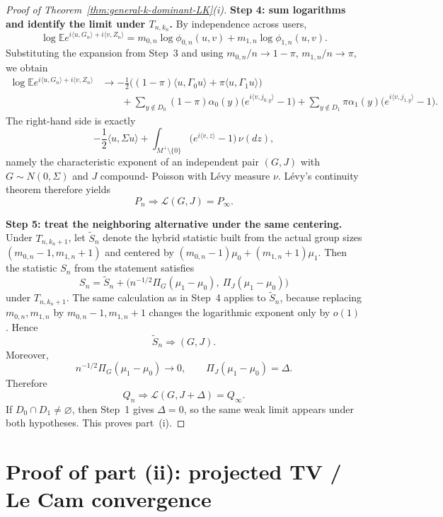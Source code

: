 \documentclass{article}
\newcommand{\E}{\mathbb E}
\newcommand{\1}{\mathbf 1}
\newcommand{\weakto}{\Longrightarrow}
\begin{document}
\begin{proof}[Proof of Theorem~\ref{thm:general-k-dominant-LK}(i)]
\medskip
\textbf{Step 4: sum logarithms and identify the limit under $T_{n,k_n}$.}
By independence across users,
\[
\log \E e^{i\langle u,G_n\rangle+i\langle v,Z_n\rangle}
=
 m_{0,n}\log\phi_{0,n}(u,v)+m_{1,n}\log\phi_{1,n}(u,v).
\]
Substituting the expansion from Step~3 and using $m_{0,n}/n\to 1-\pi$, $m_{1,n}/n\to \pi$, we obtain
\begin{align*}
\log \E e^{i\langle u,G_n\rangle+i\langle v,Z_n\rangle}
&\to
-\frac12\bigl((1-\pi)\langle u,\Gamma_0u\rangle+\pi\langle u,\Gamma_1u\rangle\bigr) \\
&\qquad +\sum_{y\notin D_0}(1-\pi)\alpha_0(y)\bigl(e^{i\langle v,j_{0,y}\rangle}-1\bigr)
+\sum_{y\notin D_1}\pi\alpha_1(y)\bigl(e^{i\langle v,j_{1,y}\rangle}-1\bigr).
\end{align*}
The right-hand side is exactly
\[
-\frac12\langle u,\Sigma u\rangle
+
\int_{M^\perp\setminus\{0\}} \bigl(e^{i\langle v,z\rangle}-1\bigr)\,\nu(dz),
\]
namely the characteristic exponent of an independent pair $(G,J)$ with $G\sim N(0,\Sigma)$ and $J$ compound-
Poisson with L\'evy measure $\nu$. L\'evy's continuity theorem therefore yields
\[
P_n\weakto \mathcal L(G,J)=P_\infty.
\]

\medskip
\textbf{Step 5: treat the neighboring alternative under the same centering.}
Under $T_{n,k_n+1}$, let $\widetilde S_n$ denote the hybrid statistic built from the actual group sizes
$(m_{0,n}-1,m_{1,n}+1)$ and centered by $(m_{0,n}-1)\mu_0+(m_{1,n}+1)\mu_1$. Then the statistic $S_n$ from the
statement satisfies
\[
S_n=\widetilde S_n+\bigl(n^{-1/2}\Pi_G(\mu_1-\mu_0),\ \Pi_J(\mu_1-\mu_0)\bigr)
\]
under $T_{n,k_n+1}$. The same calculation as in Step~4 applies to $\widetilde S_n$, because replacing
$m_{0,n},m_{1,n}$ by $m_{0,n}-1,m_{1,n}+1$ changes the logarithmic exponent only by $o(1)$. Hence
\[
\widetilde S_n\weakto (G,J).
\]
Moreover,
\[
n^{-1/2}\Pi_G(\mu_1-\mu_0)\to 0,
\qquad
\Pi_J(\mu_1-\mu_0)=\Delta.
\]
Therefore
\[
Q_n\weakto \mathcal L(G,J+\Delta)=Q_\infty.
\]
If $D_0\cap D_1\neq\varnothing$, then Step~1 gives $\Delta=0$, so the same weak limit appears under both
hypotheses. This proves part~(i).
\end{proof}

\section{Proof of part (ii): projected TV / Le Cam convergence}
\label{sec:proof-ii}
\end{document}

